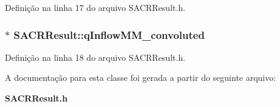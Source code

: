 Definição na linha 17 do arquivo S\+A\+C\+R\+Result.\+h.

\subsubsection[{q\+Inflow\+M\+M\+\_\+convoluted}]{$\ast$ S\+A\+C\+R\+Result\+::q\+Inflow\+M\+M\+\_\+convoluted}\label{class_s_a_c_r_result_ab041fdfb7c9406fa6f052012f5576fee}


Definição na linha 18 do arquivo S\+A\+C\+R\+Result.\+h.



A documentação para esta classe foi gerada a partir do seguinte arquivo\+:\begin{DoxyCompactItemize}
\item 
{\bf S\+A\+C\+R\+Result.\+h}\end{DoxyCompactItemize}
